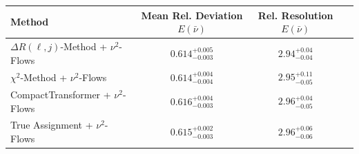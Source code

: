     \begin{tabular}{lccc}
        \toprule
        Method & Mean Rel. Deviation $E(\bar{\nu})$ & Rel. Resolution $E(\bar{\nu})$ \\
        \midrule
        $\Delta R(\ell,j)$-Method + $\nu^2$-Flows & $0.614^{+0.005}_{-0.003}$ & $2.94^{+0.04}_{-0.04}$ \\
        $\chi^2$-Method + $\nu^2$-Flows & $0.614^{+0.004}_{-0.004}$ & $2.95^{+0.11}_{-0.05}$ \\
        CompactTransformer + $\nu^2$-Flows & $0.616^{+0.004}_{-0.003}$ & $2.96^{+0.04}_{-0.05}$ \\
        True Assignment + $\nu^2$-Flows & $0.615^{+0.002}_{-0.003}$ & $2.96^{+0.06}_{-0.06}$ \\
        \bottomrule
    \end{tabular}